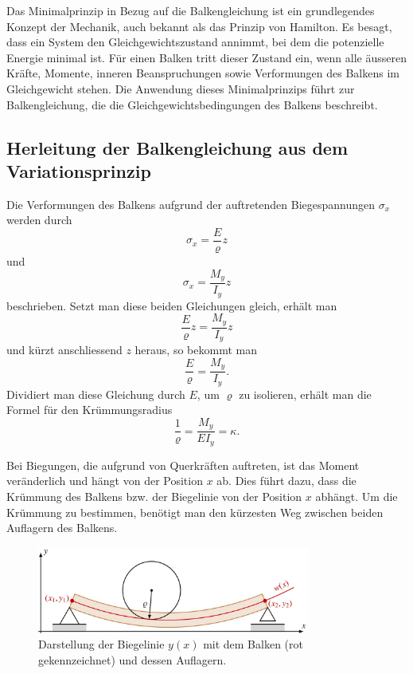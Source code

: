 Das Minimalprinzip in Bezug auf die Balkengleichung ist ein grundlegendes Konzept der Mechanik, auch bekannt als das Prinzip von Hamilton. Es besagt, dass ein System den Gleichgewichtszustand annimmt, bei dem die potenzielle Energie minimal ist. Für einen Balken tritt dieser Zustand ein, wenn alle äusseren Kräfte, Momente, inneren Beanspruchungen sowie Verformungen des Balkens im Gleichgewicht stehen. Die Anwendung dieses Minimalprinzips führt zur Balkengleichung, die die Gleichgewichtsbedingungen des Balkens beschreibt. 

\subsection{Herleitung der Balkengleichung aus dem Variationsprinzip}
Die Verformungen des Balkens aufgrund der auftretenden Biegespannungen $\sigma_x$ werden durch
\begin{equation*}
	\sigma_x = \frac{E}{\varrho} z
\end{equation*}
und
\begin{equation*}
	\sigma_x = \frac{M_y}{I_y} z
\end{equation*}
beschrieben. Setzt man diese beiden Gleichungen gleich, erhält man
\begin{equation*}
	\frac{E}{\varrho} z = \frac{M_y}{I_y} z
\end{equation*}
und kürzt anschliessend $z$ heraus, so bekommt man
\begin{equation*}
	\frac{E}{\varrho} = \frac{M_y}{I_y}.
\end{equation*}
Dividiert man diese Gleichung durch $E$, um $\varrho$ zu isolieren, erhält man die Formel für den Krümmungsradius
\begin{equation*}
	\frac{1}{\varrho} = \frac{M_y}{E I_y} = \kappa.
\end{equation*}

Bei Biegungen, die aufgrund von Querkräften auftreten, ist das Moment veränderlich und hängt von der Position $x$ ab. Dies führt dazu, dass die Krümmung des Balkens bzw. der Biegelinie von der Position $x$ abhängt. Um die Krümmung zu bestimmen, benötigt man den kürzesten Weg zwischen beiden Auflagern des Balkens.
\begin{figure}
	\centering
	\includegraphics[width=0.8\textwidth]{papers/balken/images/teil2/BiegungBalke2.jpg}
	\caption{Darstellung der Biegelinie $y(x)$ mit dem Balken (rot gekennzeichnet) und dessen Auflagern.}
	\label{fig:Darstellung_der_Biegelinie}
\end{figure}


